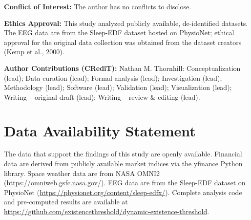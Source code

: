 \documentclass[12pt,a4paper]{article}
\begin{document}
\noindent\textbf{Conflict of Interest:} The author has no conflicts to disclose.
\medskip

\noindent\textbf{Ethics Approval:} This study analyzed publicly available, de-identified datasets. The EEG data are from the Sleep-EDF dataset hosted on PhysioNet; ethical approval for the original data collection was obtained from the dataset creators (Kemp et al., 2000).
\medskip

\noindent\textbf{Author Contributions (CRediT):} Nathan M. Thornhill: Conceptualization (lead); Data curation (lead); Formal analysis (lead); Investigation (lead); Methodology (lead); Software (lead); Validation (lead); Visualization (lead); Writing -- original draft (lead); Writing -- review \& editing (lead).

\section*{Data Availability Statement}

The data that support the findings of this study are openly available. Financial data are derived from publicly available market indices via the yfinance Python library. Space weather data are from NASA OMNI2 (\url{https://omniweb.gsfc.nasa.gov/}). EEG data are from the Sleep-EDF dataset on PhysioNet (\url{https://physionet.org/content/sleep-edfx/}). Complete analysis code and pre-computed results are available at \url{https://github.com/existencethreshold/dynamic-existence-threshold}.
\end{document}
